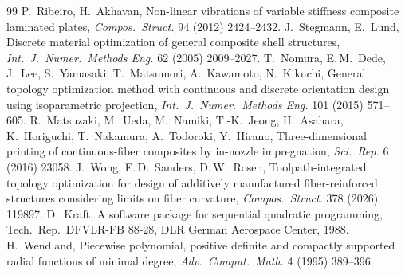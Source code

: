 \begin{thebibliography}{99}
 P.\ Ribeiro, H.\ Akhavan, Non-linear vibrations of variable
stiffness composite laminated plates, \emph{Compos.\ Struct.} 94 (2012) 2424--2432.
 J.\ Stegmann, E.\ Lund, Discrete material optimization of general
composite shell structures, \emph{Int.\ J.\ Numer.\ Methods Eng.} 62 (2005) 2009--2027.
 T.\ Nomura, E.\,M.\ Dede, J.\ Lee, S.\ Yamasaki, T.\ Matsumori, A.\ Kawamoto,
N.\ Kikuchi, General topology optimization method with continuous and discrete orientation
design using isoparametric projection, \emph{Int.\ J.\ Numer.\ Methods Eng.} 101 (2015)
571--605.
 R.\ Matsuzaki, M.\ Ueda, M.\ Namiki, T.-K.\ Jeong, H.\ Asahara, K.\
Horiguchi, T.\ Nakamura, A.\ Todoroki, Y.\ Hirano, Three-dimensional printing of
continuous-fiber composites by in-nozzle impregnation, \emph{Sci.\ Rep.} 6 (2016) 23058.
\bibitem{wong2026} J.\ Wong, E.\,D.\ Sanders, D.\,W.\ Rosen, Toolpath-integrated topology
optimization for design of additively manufactured fiber-reinforced structures considering
limits on fiber curvature, \emph{Compos.\ Struct.} 378 (2026) 119897.
\bibitem{kraft1988} D.\ Kraft, A software package for sequential quadratic programming,
Tech.\ Rep.\ DFVLR-FB 88-28, DLR German Aerospace Center, 1988.
 H.\ Wendland, Piecewise polynomial, positive definite and compactly
supported radial functions of minimal degree, \emph{Adv.\ Comput.\ Math.} 4 (1995) 389--396.
\end{thebibliography}
